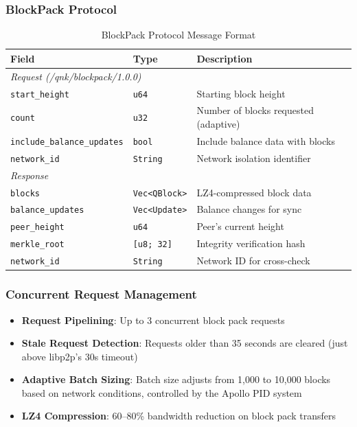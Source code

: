 \documentclass[11pt,a4paper]{article}
\begin{document}
\subsubsection{BlockPack Protocol}

\begin{table}[H]
\centering
\begin{tabular}{lll}
\toprule
\textbf{Field} & \textbf{Type} & \textbf{Description} \\
\midrule
\multicolumn{3}{l}{\textit{Request (/qnk/blockpack/1.0.0)}} \\
\texttt{start\_height} & \texttt{u64} & Starting block height \\
\texttt{count} & \texttt{u32} & Number of blocks requested (adaptive) \\
\texttt{include\_balance\_updates} & \texttt{bool} & Include balance data with blocks \\
\texttt{network\_id} & \texttt{String} & Network isolation identifier \\
\midrule
\multicolumn{3}{l}{\textit{Response}} \\
\texttt{blocks} & \texttt{Vec<QBlock>} & LZ4-compressed block data \\
\texttt{balance\_updates} & \texttt{Vec<Update>} & Balance changes for sync \\
\texttt{peer\_height} & \texttt{u64} & Peer's current height \\
\texttt{merkle\_root} & \texttt{[u8; 32]} & Integrity verification hash \\
\texttt{network\_id} & \texttt{String} & Network ID for cross-check \\
\bottomrule
\end{tabular}
\caption{BlockPack Protocol Message Format}
\end{table}

\subsubsection{Concurrent Request Management}

\begin{itemize}
    \item \textbf{Request Pipelining}: Up to 3 concurrent block pack requests
    \item \textbf{Stale Request Detection}: Requests older than 35 seconds are cleared (just above libp2p's 30s timeout)
    \item \textbf{Adaptive Batch Sizing}: Batch size adjusts from 1,000 to 10,000 blocks based on network conditions, controlled by the Apollo PID system
    \item \textbf{LZ4 Compression}: 60--80\% bandwidth reduction on block pack transfers
\end{itemize}
\end{document}
